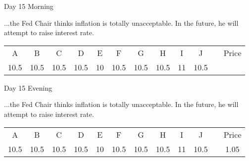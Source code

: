 \documentclass[notes=show]{beamer}
\begin{document}
\begin{frame}{Day 15 Morning}

\qquad ...the Fed Chair thinks inflation is totally
unacceptable. In the future, he will attempt to raise interest rate.

\bigskip

\begin{center}
\begin{tabular}{cccccccccccc}
A & B & C & D & E & F & G & H & I & J &  & Price \\ 
10.5 & 10.5 & 10.5 & 10.5 & 10 & 10.5 & 10.5 & 10.5 & 11 & 10.5 &  & 
\end{tabular}
\end{center}
\end{frame}

\begin{frame}{Day 15 Evening}

\qquad ...the Fed Chair thinks inflation is totally
unacceptable. In the future, he will attempt to raise interest rate.

\bigskip

\begin{center}
\begin{tabular}{cccccccccccc}
A & B & C & D & E & F & G & H & I & J &  & Price \\ 
10.5 & 10.5 & 10.5 & 10.5 & 10 & 10.5 & 10.5 & 10.5 & 11 & 10.5 &  & 1.05%
\end{tabular}
\end{center}
\end{frame}%
\end{document}
